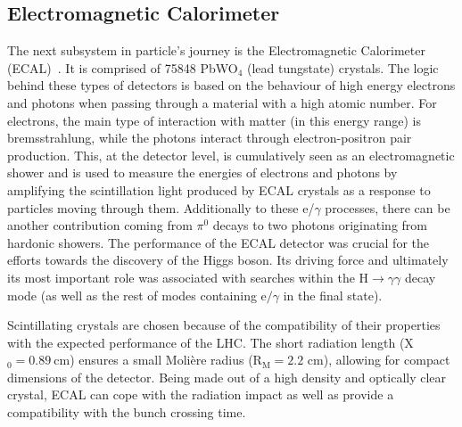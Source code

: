 \subsection{Electromagnetic Calorimeter}
\hspace{10pt} The next subsystem in particle's journey is the Electromagnetic Calorimeter (ECAL)~\cite{cms:paper,ECAL_performance}. It is comprised of 75848 PbWO$_{\text{4}}$ (lead tungstate) crystals. The logic behind these types of detectors is based on the behaviour of high energy electrons and photons when passing through a material with a high atomic number. For electrons, the main type of interaction with matter (in this energy range) is bremsstrahlung, while the photons interact through electron-positron pair production. This, at the detector level, is cumulatively seen as an electromagnetic shower and is used to measure the energies of electrons and photons by amplifying the scintillation light produced by ECAL crystals as a response to particles moving through them. Additionally to these e/$\gamma$ processes, there can be another contribution coming from $\pi^\text{0}$ decays to two photons originating from hardonic showers. The performance of the ECAL detector was crucial for the efforts towards the discovery of the Higgs boson. Its driving force and ultimately its most important role was associated with searches within the $\text{H}\rightarrow \gamma\gamma$ decay mode (as well as the rest of modes containing $\text{e}/\gamma$ in the final state). 

\hspace{10pt} Scintillating crystals are chosen because of the compatibility of their properties with the expected performance of the LHC. The short radiation length (X$_\text{0}=\text{0.89}~\text{cm}$) ensures a small Moli\`ere radius (R$_\text{M}=\text{2.2~cm}$), allowing for compact dimensions of the detector. Being made out of a high density and optically clear crystal, ECAL can cope with the radiation impact as well as provide a compatibility with the bunch crossing time.%

